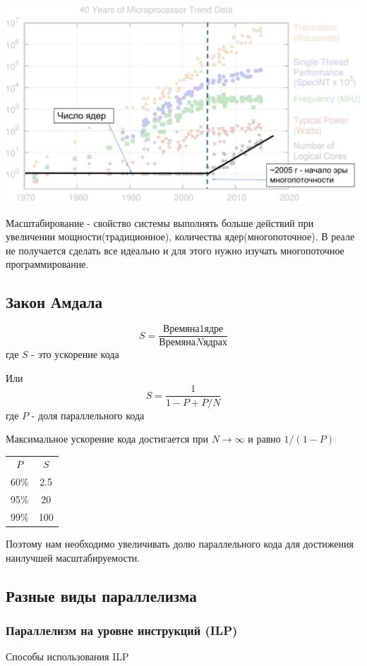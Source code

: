 \documentclass[10pt,a4paper,oneside,titlepage]{article}
\begin{document}
\includegraphics*[scale=0.5]{Mura4}

Масштабирование - свойство системы выполнять больше действий при увеличении мощности(традиционное), количества ядер(многопоточное). В реале не получается сделать все идеально и для этого нужно изучать многопоточное программирование.

\subsection{Закон Амдала}
$$
S=\frac{Время на 1 ядре}{Время на N ядрах}
$$
где $S$ - это ускорение кода

Или
$$
S=\frac{1}{1-P+P/N}
$$
где $P$ - доля параллельного кода

Максимальное ускорение кода достигается при $N\to \infty$ и равно $1/(1-P)$

\begin{tabular}{cc}
	$P$&$S$\\[5pt]
	60\%&2.5\\
	95\%&20\\
	99\%&100\\
\end{tabular}

Поэтому нам необходимо увеличивать долю параллельного кода для достижения наилучшей масштабируемости.

\subsection{Разные виды параллелизма}
\subsubsection{Параллелизм на уровне инструкций (ILP)}
Способы использования ILP
\end{document}
